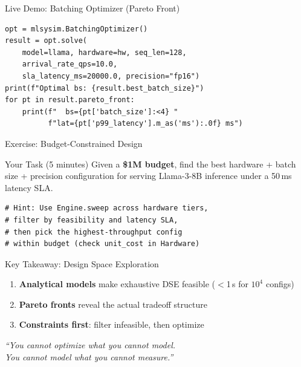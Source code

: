 \documentclass[aspectratio=169, 12pt]{beamer}
\begin{document}
\begin{frame}[fragile]{Live Demo: Batching Optimizer (Pareto Front)}
\begin{lstlisting}
opt = mlsysim.BatchingOptimizer()
result = opt.solve(
    model=llama, hardware=hw, seq_len=128,
    arrival_rate_qps=10.0,
    sla_latency_ms=20000.0, precision="fp16")
print(f"Optimal bs: {result.best_batch_size}")
for pt in result.pareto_front:
    print(f"  bs={pt['batch_size']:<4} "
          f"lat={pt['p99_latency'].m_as('ms'):.0f} ms")
\end{lstlisting}
\end{frame}

\begin{frame}[fragile]{Exercise: Budget-Constrained Design}
\begin{alertblock}{Your Task (5 minutes)}
Given a \textbf{\$1M budget}, find the best hardware + batch size + precision
configuration for serving Llama-3-8B inference under a 50\,ms latency SLA.
\end{alertblock}

\begin{lstlisting}
# Hint: Use Engine.sweep across hardware tiers,
# filter by feasibility and latency SLA,
# then pick the highest-throughput config
# within budget (check unit_cost in Hardware)
\end{lstlisting}

\end{frame}

\begin{frame}{Key Takeaway: Design Space Exploration}
\begin{center}
\Large
\begin{enumerate}
  \item \textbf{Analytical models} make exhaustive DSE feasible ($<$1\,s for $10^4$ configs)
  \item \textbf{Pareto fronts} reveal the actual tradeoff structure
  \item \textbf{Constraints first}: filter infeasible, then optimize
\end{enumerate}

\vspace{1em}
\normalsize
\textit{``You cannot optimize what you cannot model.\\
You cannot model what you cannot measure.''}
\end{center}
\end{frame}
\end{document}
